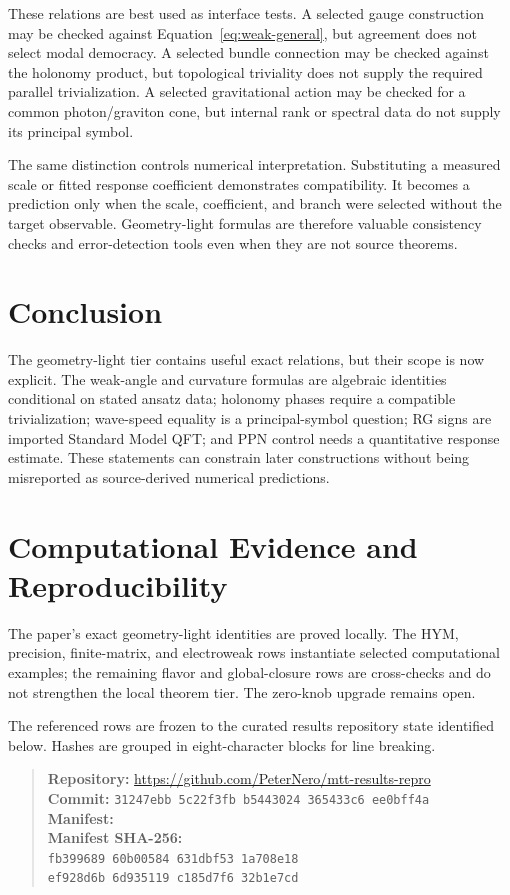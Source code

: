 \documentclass[11pt]{article}
\begin{document}
These relations are best used as interface tests. A selected gauge
construction may be checked against Equation~\eqref{eq:weak-general}, but
agreement does not select modal democracy. A selected bundle connection may
be checked against the holonomy product, but topological triviality does not
supply the required parallel trivialization. A selected gravitational action
may be checked for a common photon/graviton cone, but internal rank or spectral
data do not supply its principal symbol.

The same distinction controls numerical interpretation. Substituting a
measured scale or fitted response coefficient demonstrates compatibility. It
becomes a prediction only when the scale, coefficient, and branch were
selected without the target observable. Geometry-light formulas are therefore
valuable consistency checks and error-detection tools even when they are not
source theorems.

\section{Conclusion}

The geometry-light tier contains useful exact relations, but their scope is
now explicit. The weak-angle and curvature formulas are algebraic identities
conditional on stated ansatz data; holonomy phases require a compatible
trivialization; wave-speed equality is a principal-symbol question; RG signs
are imported Standard Model QFT; and PPN control needs a quantitative response
estimate. These statements can constrain later constructions without being
misreported as source-derived numerical predictions.

\section*{Computational Evidence and Reproducibility}
The paper's exact geometry-light identities are proved locally. The HYM, precision, finite-matrix, and electroweak rows instantiate selected computational examples; the remaining flavor and global-closure rows are cross-checks and do not strengthen the local theorem tier. The zero-knob upgrade remains open.

The referenced rows are frozen to the curated results repository state identified below. Hashes are grouped in eight-character blocks for line breaking.
\begin{quote}\small
\textbf{Repository:} \url{https://github.com/PeterNero/mtt-results-repro}\\
\textbf{Commit:} \texttt{31247ebb 5c22f3fb b5443024 365433c6 ee0bff4a}\\
\textbf{Manifest:} \\
\textbf{Manifest SHA-256:}\\
\texttt{fb399689 60b00584 631dbf53 1a708e18}\\
\texttt{ef928d6b 6d935119 c185d7f6 32b1e7cd}
\end{quote}
\end{document}

